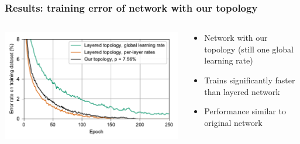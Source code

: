 \documentclass[pdf]{beamer}
\begin{document}
\begin{frame}
	\frametitle{Results: training error of network with our topology}
	\begin{columns}
	\begin{column}{.6\textwidth}
		\includegraphics[width=\textwidth]{figures/performance_original+global+ours.pdf}
	\end{column}
	\begin{column}{.4\textwidth}
	\begin{itemize}
		\item<1-> Network with our topology (still one global learning rate)
		\item<2-> Trains significantly faster than layered network
		\item<3-> Performance similar to original network
	\end{itemize}
	\end{column}
	\end{columns}
\end{frame}
\end{document}

